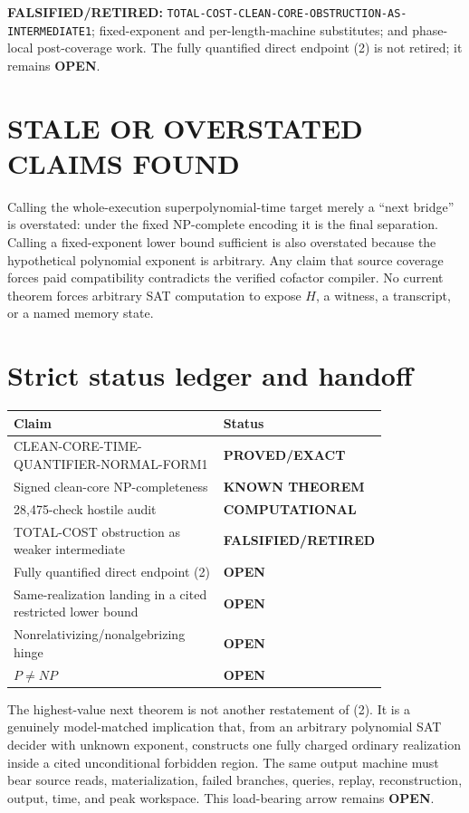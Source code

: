 \documentclass[11pt]{article}
\newcommand{\EXACT}{\textbf{PROVED/EXACT}}
\newcommand{\KNOWN}{\textbf{KNOWN THEOREM}}
\newcommand{\COMP}{\textbf{COMPUTATIONAL}}
\newcommand{\OPEN}{\textbf{OPEN}}
\newcommand{\RET}{\textbf{FALSIFIED/RETIRED}}
\begin{document}
\textbf{FALSIFIED/RETIRED:}
\texttt{TOTAL-COST-CLEAN-CORE-OBSTRUCTION-AS-INTERMEDIATE1}; fixed-exponent
and per-length-machine substitutes; and phase-local post-coverage work.  The
fully quantified direct endpoint (2) is not retired; it remains \OPEN.

\section{STALE OR OVERSTATED CLAIMS FOUND}

Calling the whole-execution superpolynomial-time target merely a ``next
bridge'' is overstated: under the fixed NP-complete encoding it is the final
separation.  Calling a fixed-exponent lower bound sufficient is also
overstated because the hypothetical polynomial exponent is arbitrary.  Any
claim that source coverage forces paid compatibility contradicts the verified
cofactor compiler.  No current theorem forces arbitrary SAT computation to
expose \(H\), a witness, a transcript, or a named memory state.

\section{Strict status ledger and handoff}

\begin{center}\small
\begin{tabular}{p{0.57\linewidth}p{0.25\linewidth}}
\toprule Claim & Status\\ \midrule
CLEAN-CORE-TIME-QUANTIFIER-NORMAL-FORM1 & \EXACT\\
Signed clean-core NP-completeness & \KNOWN\\
28,475-check hostile audit & \COMP\\
TOTAL-COST obstruction as weaker intermediate & \RET\\
Fully quantified direct endpoint (2) & \OPEN\\
Same-realization landing in a cited restricted lower bound & \OPEN\\
Nonrelativizing/nonalgebrizing hinge & \OPEN\\
\(P\ne NP\) & \OPEN\\
\bottomrule
\end{tabular}
\end{center}

The highest-value next theorem is not another restatement of (2).  It is a
genuinely model-matched implication that, from an arbitrary polynomial SAT
decider with unknown exponent, constructs one fully charged ordinary
realization inside a cited unconditional forbidden region.  The same output
machine must bear source reads, materialization, failed branches, queries,
replay, reconstruction, output, time, and peak workspace.  This load-bearing
arrow remains \OPEN.
\end{document}
